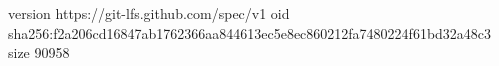 version https://git-lfs.github.com/spec/v1
oid sha256:f2a206cd16847ab1762366aa844613ec5e8ec860212fa7480224f61bd32a48c3
size 90958
